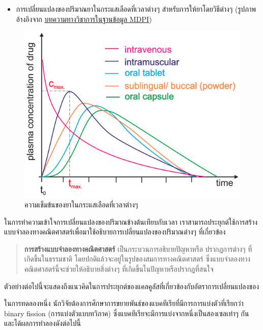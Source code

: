 \documentclass[
]{book}
\providecommand{\tightlist}{%
  \setlength{\itemsep}{0pt}\setlength{\parskip}{0pt}}
\begin{document}
\begin{itemize}
\tightlist
\item
  การเปลี่ยนแปลงของปริมาณยาในกระแสเลือดที่เวลาต่างๆ สำหรับการให้ยาโดยวิธีต่างๆ
  (รูปภาพอ้างอิงจาก
  \href{https://www.mdpi.com/1420-3049/28/24/8038}{บทความทางวิชาการในฐานข้อมูล
  MDPI})
\end{itemize}

\begin{figure}
\includegraphics[width=1\linewidth]{images/fig-drug-absorption} \caption{ความเข็มข้นของยาในกระแสเลือดที่เวลาต่างๆ }\label{fig:fig-drug-absorption}
\end{figure}

ในการทำความเข้าใจการเปลี่ยนแปลงของปริมาณข้างต้นเทียบกับเวลา
เราสามารถประยุกต์ใช้การสร้างแบบจำลองทางคณิตศาสตร์เพื่อมาใช้อธิบายการเปลี่ยนแปลงของปริมาณต่างๆ
ที่เกี่ยวข้อง

\begin{quote}
\textbf{การสร้างแบบจำลองทางคณิตศาสตร์} เป็นกระบวนการอธิบายปัญหาหรือ
ปรากฎการต่างๆ ที่เกิดขึ้นในธรรมชาติ โดยปกติแล้วจะอยู่ในรูปของสมการทางคณิตศาสตร์
ซึ่งแบบจำลองทางคณิตศาสตร์นี้จะช่วยให้อธิบายสิ่งต่างๆ ที่เกิดขึ้นในปัญหาหรือปรากฏที่สนใจ
\end{quote}

ตัวอย่างต่อไปนี้จะแสดงถึงแนวคิดในการประยุกต์ของแคลคูลัสที่เกี่ยวข้องกับอัตราการเปลี่ยนแปลงของ

\label{exm1}
ในการทดลองหนึ่ง นักวิจัยต้องการศึกษาการขยายพันธ์ของแบคทีเรียที่มีการการแบ่งตัวที่เรียกว่า
binary fission (การแบ่งตัวแบบทวิภาค) ซึ่งแบคทีเรียจะมีการแบ่งจากหนึ่งเป็นสองเซลเท่าๆ
กัน และได้ผลการทำลองดังต่อไปนี้
\end{document}
